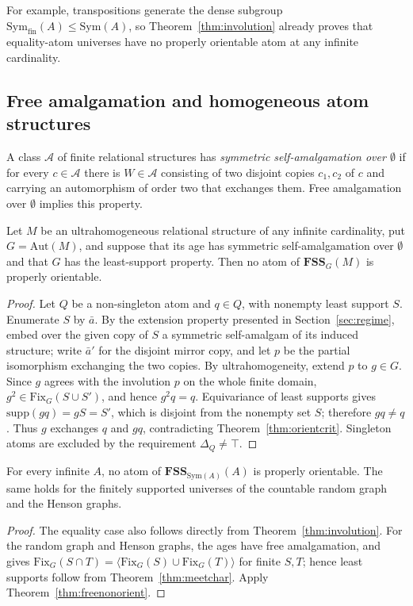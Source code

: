\documentclass{lmcs}
\newcommand{\Sym}{\mathrm{Sym}}
\newcommand{\Symfin}{\mathrm{Sym}_{\mathrm{fin}}}
\newcommand{\Fix}{\mathrm{Fix}}
\newcommand{\supp}{\mathrm{supp}}
\newcommand{\Aut}{\mathrm{Aut}}
\newcommand{\FSS}{\mathbf{FSS}}
\begin{document}
For example, transpositions generate the dense subgroup
$\Symfin(A)\leq\Sym(A)$, so Theorem~\ref{thm:involution} already proves
that equality-atom universes have no properly orientable atom at any
infinite cardinality.

\subsection{Free amalgamation and homogeneous atom structures}

\begin{defi}\label{def:flipamalg}
A class $\mathcal A$ of finite relational structures has
\emph{symmetric self-amalgamation over $\emptyset$} if for every
$c\in\mathcal A$ there is $W\in\mathcal A$ consisting of two disjoint
copies $c_1,c_2$ of $c$ and carrying an automorphism of order two that
exchanges them. Free amalgamation over $\emptyset$ implies this property.
\end{defi}

\begin{thm}
\label{thm:freenonorient}
Let $M$ be an ultrahomogeneous relational structure of any infinite
cardinality, put $G=\Aut(M)$, and suppose that its age has symmetric
self-amalgamation over $\emptyset$ and that $G$ has the least-support
property. Then no atom of $\FSS_G(M)$ is properly orientable.
\end{thm}
\begin{proof}
Let $Q$ be a non-singleton atom and $q\in Q$, with nonempty least support
$S$. Enumerate $S$ by $\bar a$. By the extension property presented in Section~\ref{sec:regime}, embed over the given copy of $S$ a symmetric
self-amalgam of its induced structure; write $\bar a'$ for the disjoint
mirror copy, and let $p$ be the partial isomorphism exchanging the two
copies. By ultrahomogeneity, extend $p$ to $g\in G$. Since $g$ agrees
with the involution $p$ on the whole finite domain,
$g^2\in\Fix_G(S\cup S')$, and hence $g^2q=q$. Equivariance of least
supports gives $\supp(gq)=gS=S'$, which is disjoint from the nonempty set
$S$; therefore $gq\neq q$. Thus $g$ exchanges $q$ and $gq$, contradicting
Theorem~\ref{thm:orientcrit}. Singleton atoms are excluded by the
requirement $\Delta_Q\neq\top$.
\end{proof}

\begin{cor}\label{thm:nonorient}
For every infinite $A$, no atom of $\FSS_{\Sym(A)}(A)$ is properly
orientable. The same holds for the finitely supported universes of the
countable random graph and the Henson graphs.
\end{cor}
\begin{proof}
The equality case also follows directly from
Theorem~\ref{thm:involution}. For the random graph and Henson graphs, the
ages have free amalgamation, and
\cite[Lem.~2.7(i)]{MacphersonTent11} gives
$\Fix_G(S\cap T)=\langle\Fix_G(S)\cup\Fix_G(T)\rangle$ for finite
$S,T$; hence least supports follow from Theorem~\ref{thm:meetchar}.
Apply Theorem~\ref{thm:freenonorient}.
\end{proof}
\end{document}
